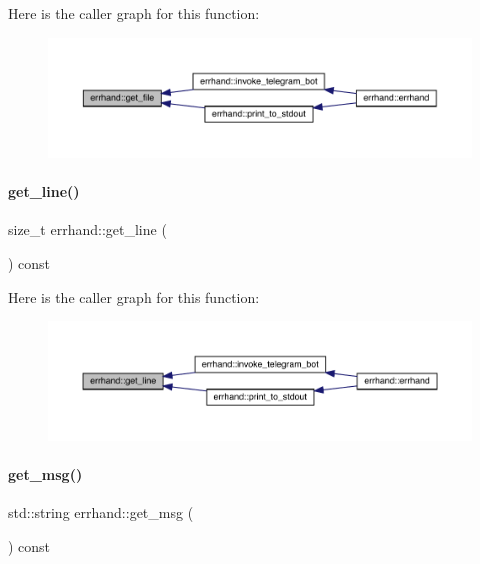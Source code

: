 Here is the caller graph for this function\+:\nopagebreak
\begin{figure}[H]
\begin{center}
\leavevmode
\includegraphics[width=350pt]{classerrhand_a1556ee8d0aaefeea3bbab73f7ae50914_icgraph}
\end{center}
\end{figure}
\mbox{\label{classerrhand_a258f97d84476b21efc38827cda3e5889}} 
\paragraph{\texorpdfstring{get\+\_\+line()}{get\_line()}}
{\footnotesize\ttfamily size\+\_\+t errhand\+::get\+\_\+line (\begin{DoxyParamCaption}{ }\end{DoxyParamCaption}) const\hspace{0.3cm}{\ttfamily [inline]}}

Here is the caller graph for this function\+:\nopagebreak
\begin{figure}[H]
\begin{center}
\leavevmode
\includegraphics[width=350pt]{classerrhand_a258f97d84476b21efc38827cda3e5889_icgraph}
\end{center}
\end{figure}
\mbox{\label{classerrhand_a524dfc6821f703329d8801dd3298f33f}} 
\paragraph{\texorpdfstring{get\+\_\+msg()}{get\_msg()}}
{\footnotesize\ttfamily std\+::string errhand\+::get\+\_\+msg (\begin{DoxyParamCaption}{ }\end{DoxyParamCaption}) const\hspace{0.3cm}{\ttfamily [inline]}}

